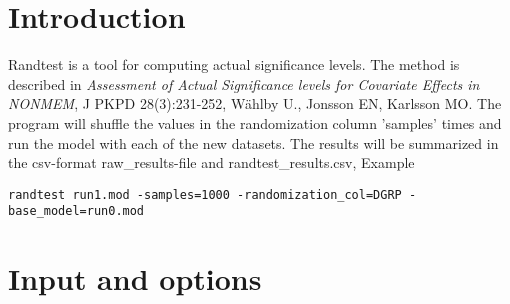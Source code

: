 



\maketitle
\newcommand{\guidetoolname}{randtest}


\section{Introduction}

Randtest is a tool for computing actual significance levels. The method is described in
\emph{Assessment of Actual Significance levels for Covariate Effects in NONMEM}, 
J PKPD 28(3):231-252, Wählby U., Jonsson EN, Karlsson MO. 
The program will shuffle the values in the randomization 
column 'samples' times and run the model with each of the new datasets. The results will be summarized in the csv-format raw\_results-file and randtest\_results.csv,
Example
\begin{verbatim}
randtest run1.mod -samples=1000 -randomization_col=DGRP -base_model=run0.mod
\end{verbatim}

\section{Input and options}

